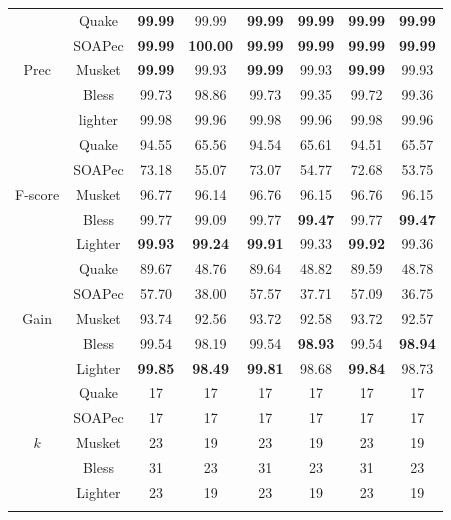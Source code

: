 \documentclass{bmcart}
\begin{document}
\begin{backmatter}
\begin{table}[h!]
\begin{tabular}{|c|c|c|c|c|c|c|c|}
		&	Quake&	\textbf{99.99}&	99.99 &	\textbf{99.99}&	\textbf{99.99}&	\textbf{99.99}&	\textbf{99.99}\\ \cline{2-8}
		&  SOAPec& \textbf{99.99}	&	\textbf{100.00}	&	\textbf{99.99}	& \textbf{99.99}	& \textbf{99.99}	& \textbf{99.99} \\ \cline{2-8}
Prec	&	Musket&	\textbf{99.99}&	99.93&	\textbf{99.99}&	99.93&	\textbf{99.99}&	99.93	\\ \cline{2-8}
		&	Bless&	99.73&	98.86&	99.73&	99.35&	99.72&	99.36	\\ \cline{2-8}
		&	lighter&	99.98&	99.96&	99.98&	99.96&	99.98&	99.96\\ \hhline{|=|=|=|=|=|=|=|=|}
		
		&	Quake&	94.55&	65.56&	94.54&	65.61&	94.51&	65.57	\\ \cline{2-8}
		& SOAPec & 73.18 &	55.07 &	73.07 &	54.77&	72.68&	53.75   \\ \cline{2-8}
F-score	&	Musket&	96.77&	96.14&	96.76&	96.15&	96.76&	96.15	\\ \cline{2-8}
		&	Bless&	99.77&	99.09&	99.77&	\textbf{99.47}&	99.77&	\textbf{99.47}	\\ \cline{2-8}
		&	Lighter&	\textbf{99.93}&	\textbf{99.24}&	\textbf{99.91}&	99.33&	\textbf{99.92}&	99.36\\ \hhline{|=|=|=|=|=|=|=|=|}
		
		&	Quake&	89.67&	48.76&	89.64&	48.82&	89.59&	48.78	\\ \cline{2-8}
		& SOAPec&	57.70& 	38.00& 	57.57&	37.71&	57.09&	36.75 	\\ \cline{2-8}
Gain	&	Musket&	93.74&	92.56&	93.72&	92.58&	93.72&	92.57	\\ \cline{2-8}
		&	Bless&	99.54&	98.19&	99.54&	\textbf{98.93}&	99.54&	\textbf{98.94}	\\ \cline{2-8}
		&	Lighter&\textbf{99.85}&	\textbf{98.49}&	\textbf{99.81}&	98.68&	\textbf{99.84}&	98.73	\\ \hhline{|=|=|=|=|=|=|=|=|}
		
		&Quake	&17	&17	&17	&17	&17	&17 \\ \cline{2-8}
		&SOAPec	&17	&17	&17	&17	&17	&17 \\ \cline{2-8}
$k$		&Musket	&23	&19	&23	&19	&23	&19 \\ \cline{2-8}
		&Bless	&31	&23	&31	&23	&31	&23 \\ \cline{2-8}
		&Lighter	&23	&19	&23	&19	&23	&19 \\ \hhline{|=|=|=|=|=|=|=|=|}
\end{tabular}
\end{table}



\end{backmatter}
\end{document}
